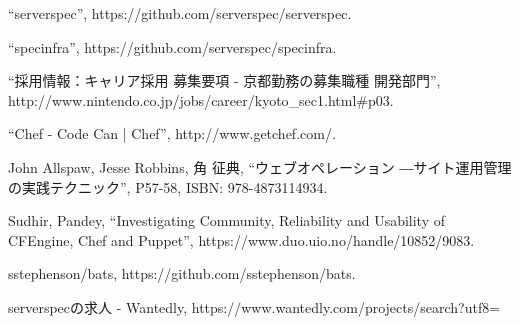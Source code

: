 \begin{thebibliography}{99}
``serverspec'', https://github.com/serverspec/serverspec.

``specinfra'', https://github.com/serverspec/specinfra.

``採用情報：キャリア採用 募集要項 - 京都勤務の募集職種 開発部門'',
http://www.nintendo.co.jp/jobs/career/kyoto\_sec1.html\#p03.

``Chef - Code Can | Chef'', http://www.getchef.com/.

John Allspaw, Jesse Robbins, 角 征典,
``ウェブオペレーション ―サイト運用管理の実践テクニック'',
P57-58, ISBN: 978-4873114934.

Sudhir, Pandey,
``Investigating Community, Reliability and Usability of CFEngine, Chef and Puppet'',
https://www.duo.uio.no/handle/10852/9083.

sstephenson/bats,
https://github.com/sstephenson/bats.

serverspecの求人 - Wantedly,
https://www.wantedly.com/projects/search?utf8=%

\end{thebibliography}
